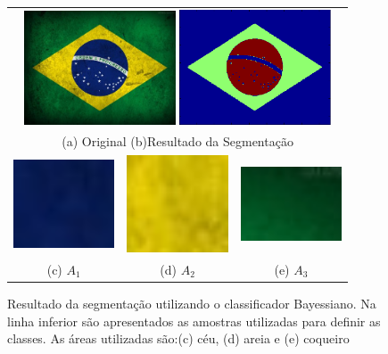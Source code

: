 \documentclass[ 
	article,			%
	11pt,				%
	oneside,			%
	a4paper,			%
	english,			%
	brazil,				%
	]{abntex2}
\begin{document}
\begin{figure}
	\centering
	\begin{tabular}{ccc}
	\multicolumn{3}{c}{
	  \includegraphics[width=45mm]{matlab/figura/gauss/segmentacao/brasil.jpg} 
	  \includegraphics[width=45mm]{matlab/figura/gauss/segmentacao/brasilSeg.png}
	  }\\ 
	\multicolumn{3}{c}{
	 \hspace{1cm} (a) Original \hspace{15mm} (b)Resultado da Segmentação
	  }\\ 	  
	 \includegraphics[width=30mm]{matlab/figura/gauss/segmentacao/bc1.png}&   
	 \includegraphics[width=30mm]{matlab/figura/gauss/segmentacao/bc2.png}& 
	 \includegraphics[width=30mm]{matlab/figura/gauss/segmentacao/bc3.png} \\
	(c) $A_1$ & (d) $A_2$ & (e) $A_3$\\[6pt] 

	\end{tabular}
	\caption{Resultado da segmentação utilizando o classificador Bayessiano. Na
	linha inferior são apresentados as amostras utilizadas para definir as
	classes. As áreas utilizadas são:(c) céu, (d) areia e (e) coqueiro}
	\label{fig:resultBandSegParadise}
\end{figure}
\end{document}
